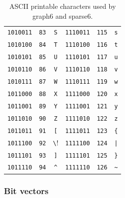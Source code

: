 \begin{table}[!htbp]
\begin{tabular}{|ccc|ccc|}
\verb!1010011! & \verb!83! & \verb!S! & \verb!1110011! & \verb!115! & \verb!s! \\
\verb!1010100! & \verb!84! & \verb!T! & \verb!1110100! & \verb!116! & \verb!t! \\
\verb!1010101! & \verb!85! & \verb!U! & \verb!1110101! & \verb!117! & \verb!u! \\
\verb!1010110! & \verb!86! & \verb!V! & \verb!1110110! & \verb!118! & \verb!v! \\
\verb!1010111! & \verb!87! & \verb!W! & \verb!1110111! & \verb!119! & \verb!w! \\
\verb!1011000! & \verb!88! & \verb!X! & \verb!1111000! & \verb!120! & \verb!x! \\
\verb!1011001! & \verb!89! & \verb!Y! & \verb!1111001! & \verb!121! & \verb!y! \\
\verb!1011010! & \verb!90! & \verb!Z! & \verb!1111010! & \verb!122! & \verb!z! \\
\verb!1011011! & \verb!91! & \verb![! & \verb!1111011! & \verb!123! & \verb!{! \\
\verb!1011100! & \verb!92! & \verb!\! & \verb!1111100! & \verb!124! & \verb!|! \\
\verb!1011101! & \verb!93! & \verb!]! & \verb!1111101! & \verb!125! & \verb!}! \\
\verb!1011110! & \verb!94! & \verb!^! & \verb!1111110! & \verb!126! & \verb!~! \\\hline
\end{tabular}
\caption{ASCII printable characters used by graph6 and sparse6.}
\label{tab:graph_algorithms:graph6_sparse6_ASCII_printable_characters}
\end{table}



\subsubsection{Bit vectors}

